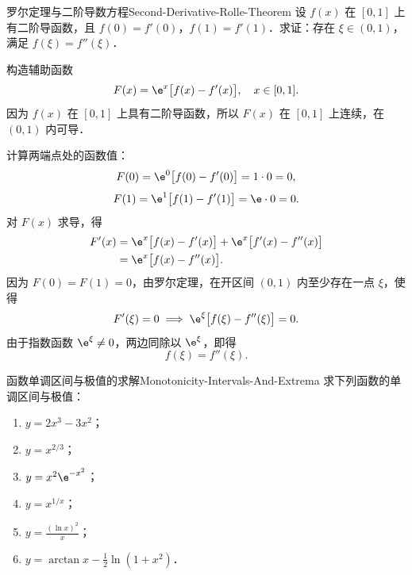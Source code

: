 \begin{problem}{罗尔定理与二阶导数方程}{Second-Derivative-Rolle-Theorem}
    设 $f(x)$ 在 $[0, 1]$ 上有二阶导函数，且 $f(0) = f'(0)$，$f(1) = f'(1)$．求证：存在 $\xi \in (0, 1)$，满足 $f(\xi) = f''(\xi)$．
\end{problem}

\begin{myproof}
    构造辅助函数
    \begin{equation}
        F(x) = \e^x \bigl[ f(x) - f'(x) \bigr], \quad x \in [0, 1].
    \end{equation}
    因为 $f(x)$ 在 $[0, 1]$ 上具有二阶导函数，所以 $F(x)$ 在 $[0, 1]$ 上连续，在 $(0, 1)$ 内可导．

    计算两端点处的函数值：
    \begin{equation}
        F(0) = \e^0 \bigl[ f(0) - f'(0) \bigr] = 1 \cdot 0 = 0,
    \end{equation}
    \begin{equation}
        F(1) = \e^1 \bigl[ f(1) - f'(1) \bigr] = \e \cdot 0 = 0.
    \end{equation}
    对 $F(x)$ 求导，得
    \begin{equation}
        \begin{aligned}
            F'(x) & = \e^x \bigl[ f(x) - f'(x) \bigr] + \e^x \bigl[ f'(x) - f''(x) \bigr] \\
                  & = \e^x \bigl[ f(x) - f''(x) \bigr].
        \end{aligned}
    \end{equation}
    因为 $F(0) = F(1) = 0$，由罗尔定理，在开区间 $(0, 1)$ 内至少存在一点 $\xi$，使得
    \begin{equation}
        F'(\xi) = 0 \implies \e^\xi \bigl[ f(\xi) - f''(\xi) \bigr] = 0.
    \end{equation}
    由于指数函数 $\e^\xi \neq 0$，两边同除以 $\e^\xi$，即得
    \begin{equation}
        f(\xi) = f''(\xi).
    \end{equation}
\end{myproof}

\begin{problem}{函数单调区间与极值的求解}{Monotonicity-Intervals-And-Extrema}
    求下列函数的单调区间与极值：
    \begin{enumerate}
        \item $y = 2x^3 - 3x^2$；
        \item $y = x^{2/3}$；
        \item $y = x^2 \e^{-x^2}$；
        \item $y = x^{1/x}$；
        \item $y = \frac{(\ln x)^2}{x}$；
        \item $y = \arctan x - \frac{1}{2}\ln(1 + x^2)$．
    \end{enumerate}
\end{problem}

